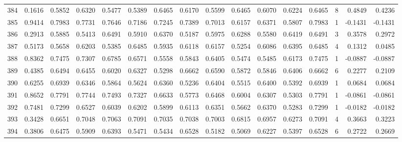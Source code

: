 \begin{tabular}{lrrrrrrrrrrrrrrr}
384 &      0.1616 &  0.5852 &  0.6320 &  0.5477 &  0.5389 &  0.6465 &  0.6170 &  0.5599 &  0.6465 &  0.6070 &   0.6224 &     0.6465 &      8 &                    0.4849 &                     0.4236 \\
385 &      0.9414 &  0.7983 &  0.7731 &  0.7646 &  0.7186 &  0.7245 &  0.7389 &  0.7013 &  0.6157 &  0.6371 &   0.5807 &     0.7983 &      1 &                   -0.1431 &                    -0.1431 \\
386 &      0.2913 &  0.5885 &  0.5413 &  0.6491 &  0.5910 &  0.6370 &  0.5187 &  0.5975 &  0.6288 &  0.5580 &   0.6419 &     0.6491 &      3 &                    0.3578 &                     0.2972 \\
387 &      0.5173 &  0.5658 &  0.6203 &  0.5385 &  0.6485 &  0.5935 &  0.6118 &  0.6157 &  0.5254 &  0.6086 &   0.6395 &     0.6485 &      4 &                    0.1312 &                     0.0485 \\
388 &      0.8362 &  0.7475 &  0.7307 &  0.6785 &  0.6571 &  0.5558 &  0.5843 &  0.6405 &  0.5474 &  0.5485 &   0.6173 &     0.7475 &      1 &                   -0.0887 &                    -0.0887 \\
389 &      0.4385 &  0.6494 &  0.6455 &  0.6020 &  0.6327 &  0.5298 &  0.6662 &  0.6590 &  0.5872 &  0.5846 &   0.6406 &     0.6662 &      6 &                    0.2277 &                     0.2109 \\
390 &      0.6255 &  0.6939 &  0.6346 &  0.5864 &  0.5624 &  0.6360 &  0.5236 &  0.6404 &  0.5515 &  0.6400 &   0.5392 &     0.6939 &      1 &                    0.0684 &                     0.0684 \\
391 &      0.8652 &  0.7791 &  0.7744 &  0.7493 &  0.7327 &  0.6633 &  0.5773 &  0.6468 &  0.6004 &  0.6307 &   0.5303 &     0.7791 &      1 &                   -0.0861 &                    -0.0861 \\
392 &      0.7481 &  0.7299 &  0.6527 &  0.6039 &  0.6202 &  0.5899 &  0.6113 &  0.6351 &  0.5662 &  0.6370 &   0.5283 &     0.7299 &      1 &                   -0.0182 &                    -0.0182 \\
393 &      0.3428 &  0.6651 &  0.7048 &  0.7063 &  0.7091 &  0.7035 &  0.7038 &  0.7003 &  0.6815 &  0.6957 &   0.6273 &     0.7091 &      4 &                    0.3663 &                     0.3223 \\
394 &      0.3806 &  0.6475 &  0.5909 &  0.6393 &  0.5471 &  0.5434 &  0.6528 &  0.5182 &  0.5069 &  0.6227 &   0.5397 &     0.6528 &      6 &                    0.2722 &                     0.2669 \\

\end{tabular}
